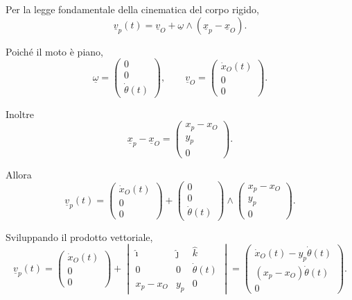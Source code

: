 \begin{examplebreak}{}
Per la legge fondamentale della cinematica del corpo rigido,
\[
\underline{v}_p(t)=\underline{v}_O+\underline{\omega}\wedge(\underline{x}_p-\underline{x}_O).
\]

Poiché il moto è piano,
\[
\underline{\omega}=
\begin{pmatrix}
0\\
0\\
\dot{\theta}(t)
\end{pmatrix},
\qquad
\underline{v}_O=
\begin{pmatrix}
\dot{x}_O(t)\\
0\\
0
\end{pmatrix}.
\]

Inoltre
\[
\underline{x}_p-\underline{x}_O=
\begin{pmatrix}
x_p-x_O\\
y_p\\
0
\end{pmatrix}.
\]

Allora
\[
\underline{v}_p(t)=
\begin{pmatrix}
\dot{x}_O(t)\\
0\\
0
\end{pmatrix}
+
\begin{pmatrix}
0\\
0\\
\dot{\theta}(t)
\end{pmatrix}
\wedge
\begin{pmatrix}
x_p-x_O\\
y_p\\
0
\end{pmatrix}.
\]

Sviluppando il prodotto vettoriale,
\[
\underline{v}_p(t)=
\begin{pmatrix}
\dot{x}_O(t)\\
0\\
0
\end{pmatrix}
+
\begin{vmatrix}
\hat{\imath} & \hat{\jmath} & \hat{k}\\
0 & 0 & \dot{\theta}(t)\\
x_p-x_O & y_p & 0
\end{vmatrix}
=
\begin{pmatrix}
\dot{x}_O(t)-y_p\dot{\theta}(t)\\
(x_p-x_O)\dot{\theta}(t)\\
0
\end{pmatrix}.
\]


\end{examplebreak}
